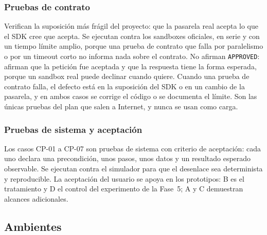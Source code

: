 \subsubsection{Pruebas de contrato}

Verifican la suposición más frágil del proyecto: que la pasarela real acepta lo que el SDK cree que acepta. Se ejecutan contra los sandboxes oficiales, en serie y con un tiempo límite amplio, porque una prueba de contrato que falla por paralelismo o por un timeout corto no informa nada sobre el contrato. No afirman \texttt{APPROVED}: afirman que la petición fue aceptada y que la respuesta tiene la forma esperada, porque un sandbox real puede declinar cuando quiere. Cuando una prueba de contrato falla, el defecto está en la suposición del SDK o en un cambio de la pasarela, y en ambos casos se corrige el código o se documenta el límite. Son las únicas pruebas del plan que salen a Internet, y nunca se usan como carga.

\subsubsection{Pruebas de sistema y aceptación}

Los casos CP-01 a CP-07 son pruebas de sistema con criterio de aceptación: cada uno declara una precondición, unos pasos, unos datos y un resultado esperado observable. Se ejecutan contra el simulador para que el desenlace sea determinista y reproducible. La aceptación del usuario se apoya en los prototipos: B es el tratamiento y D el control del experimento de la Fase~5; A y C demuestran alcances adicionales.

\subsection{Ambientes}

